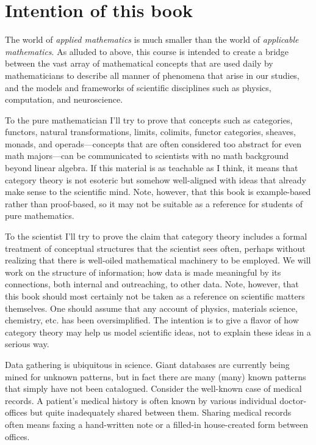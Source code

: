
\section{Intention of this book}

The world of {\em applied mathematics} is much smaller than the world of {\em applicable mathematics}. As alluded to above, this course is intended to create a bridge between the vast array of mathematical concepts that are used daily by mathematicians to describe all manner of phenomena that arise in our studies, and the models and frameworks of scientific disciplines such as physics, computation, and neuroscience. 

To the pure mathematician I'll try to prove that concepts such as categories, functors, natural transformations, limits, colimits, functor categories, sheaves, monads, and operads---concepts that are often considered too abstract for even math majors---can be communicated to scientists with no math background beyond linear algebra. If this material is as teachable as I think, it means that category theory is not esoteric but somehow well-aligned with ideas that already make sense to the scientific mind. Note, however, that this book is example-based rather than proof-based, so it may not be suitable as a reference for students of pure mathematics.

To the scientist I'll try to prove the claim that category theory includes a formal treatment of conceptual structures that the scientist sees often, perhaps without realizing that there is well-oiled mathematical machinery to be employed. We will work on the structure of information; how data is made meaningful by its connections, both internal and outreaching, to other data. Note, however, that this book should most certainly not be taken as a reference on scientific matters themselves. One should assume that any account of physics, materials science, chemistry, etc. has been oversimplified. The intention is to give a flavor of how category theory may help us model scientific ideas, not to explain these ideas in a serious way. 

Data gathering is ubiquitous in science. Giant databases are currently being mined for unknown patterns, but in fact there are many (many) known patterns that simply have not been catalogued. Consider the well-known case of medical records. A patient's medical history is often known by various individual doctor-offices but quite inadequately shared between them. Sharing medical records often means faxing a hand-written note or a filled-in house-created form between offices. 

